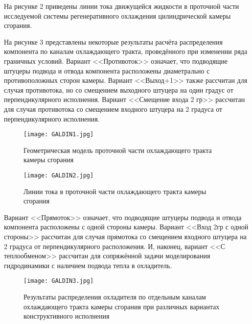 На рисунке 2 приведены линии тока движущейся жидкости в проточной части исследуемой системы регенеративного охлаждения цилиндрической камеры сгорания.

На рисунке 3 представлены некоторые результаты расчёта распределения компонента по каналам охлаждающего тракта,
проведённого при изменении ряда граничных условий.
Вариант <<Противоток>> означает,
что подводящие штуцеры подвода и отвода компонента расположены диаметрально с противоположных сторон камеры.
Вариант <<Выход+1>> также рассчитан для случая противотока,
но со смещением выходного штуцера на один градус от перпендикулярного исполнения.
Вариант <<Смещение входа 2 гр>> рассчитан для случая противотока со смещением входного штуцера на 2 градуса от перпендикулярного исполнения.

\begin{figure}
	\centering
	\texttt{[image: GALDIN1.jpg]}
	\caption{Геометрическая модель проточной части охлаждающего тракта камеры сгорания}
\end{figure}

\begin{figure}
	\centering
	\texttt{[image: GALDIN2.jpg]}
	\caption{Линии тока в проточной части охлаждающего тракта камеры сгорания}
\end{figure}

Вариант <<Прямоток>> означает, что подводящие штуцеры подвода и отвода компонента расположены с одной стороны камеры. Вариант <<Вход 2гр с одной стороны>> рассчитан для случая прямотока со смещением входного штуцера на 2 градуса от перпендикулярного расположения. И, наконец, вариант <<С теплообменом>> рассчитан для сопряжённой задачи моделирования гидродинамики с наличием подвода тепла в охладитель.
\begin{figure}
	\centering
	\texttt{[image: GALDIN3.jpg]}
	\caption{Результаты распределения охладителя по отдельным каналам охлаждающего тракта камеры сгорания при различных вариантах конструктивного исполнения}
\end{figure}

